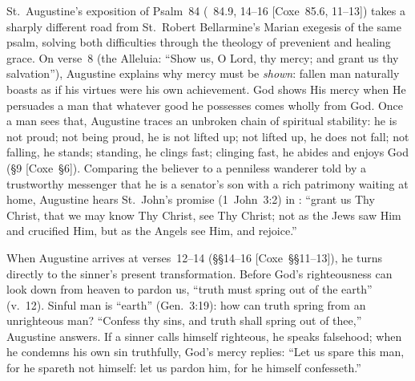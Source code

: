 St.~Augustine's exposition of Psalm~84 (~84.9, 14--16 [Coxe~85.6, 11--13]) takes a sharply different road from St.~Robert Bellarmine's Marian exegesis of the same psalm, solving both difficulties through the theology of prevenient and healing grace. On verse~8 (the Alleluia: ``Show us, O Lord, thy mercy; and grant us thy salvation''), Augustine explains why mercy must be \emph{shown}: fallen man naturally boasts as if his virtues were his own achievement. God shows His mercy when He persuades a man that whatever good he possesses comes wholly from God. Once a man sees that, Augustine traces an unbroken chain of spiritual stability: he is not proud; not being proud, he is not lifted up; not lifted up, he does not fall; not falling, he stands; standing, he clings fast; clinging fast, he abides and enjoys God (\S9 [Coxe~\S6]). Comparing the believer to a penniless wanderer told by a trustworthy messenger that he is a senator's son with a rich patrimony waiting at home, Augustine hears St.~John's promise (1~John~3:2) in : ``grant us Thy Christ, that we may know Thy Christ, see Thy Christ; not as the Jews saw Him and crucified Him, but as the Angels see Him, and rejoice.''

When Augustine arrives at verses~12--14 (\S\S14--16 [Coxe~\S\S11--13]), he turns directly to the sinner's present transformation. Before God's righteousness can look down from heaven to pardon us, ``truth must spring out of the earth'' (v.~12). Sinful man is ``earth'' (Gen.~3:19): how can truth spring from an unrighteous man? ``Confess thy sins, and truth shall spring out of thee,'' Augustine answers. If a sinner calls himself righteous, he speaks falsehood; when he condemns his own sin truthfully, God's mercy replies: ``Let us spare this man, for he spareth not himself: let us pardon him, for he himself confesseth.''

